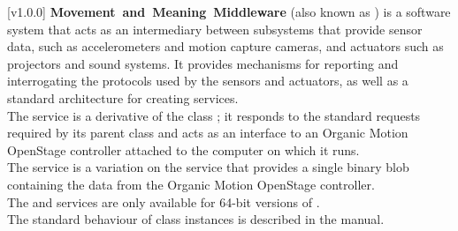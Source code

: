 [v1.0.0]
\textbf{Movement~and~Meaning~Middleware} (also known as \mplusm) is a software system
that acts as an intermediary between subsystems that provide sensor data, such as
accelerometers and motion capture cameras, and actuators such as projectors and sound
systems.
It provides mechanisms for reporting and interrogating the protocols used by the sensors
and actuators, as well as a standard architecture for creating services.\\

The \OSI{} service is a derivative of the \mplusm{} class ;
it responds to the standard requests required by its parent class and acts as an interface
to an Organic Motion OpenStage controller attached to the computer on which it runs.\\

The \OSBI{} service is a variation on the \OSI{} service that provides a single binary
blob containing the data from the Organic Motion OpenStage controller.\\

The \OSI{} and \OSBI{} services are only available for \win{} 64-bit versions of
\mplusm.\\

The standard behaviour of  class instances is described in
the \emph{\MMM} manual.
\primaryEnd{}
